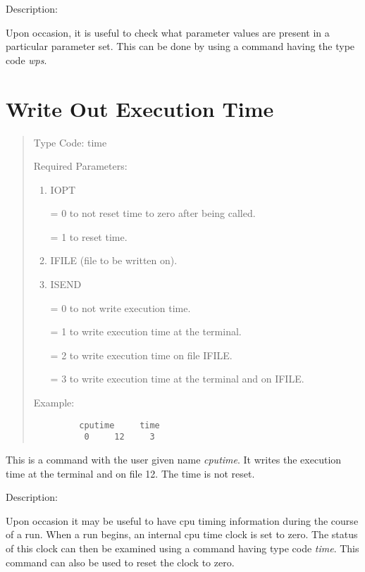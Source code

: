 \vspace{5mm}
     Description:
\vspace{2mm}

Upon occasion, it is useful to check what parameter values are present in
a particular parameter set.  This can be done by using a command having
the type code {\em wps}.

\newpage
\section{Write Out Execution Time}
\begin{quotation}
\noindent Type Code:  time
\vspace{5mm}

\noindent Required Parameters:
\begin{enumerate}
      \item  IOPT

             = 0 to not reset time to zero after being called.

             = 1 to reset time.

      \item  IFILE (file to be written on).

      \item  ISEND

              = 0 to not write execution time.

              = 1 to write execution time at the terminal.

              = 2 to write execution time on file IFILE.

              = 3 to write execution time at the terminal and on IFILE.
\end{enumerate}

\vspace{5mm}
\noindent Example:
\begin{verbatim}
         cputime     time
          0     12     3
\end{verbatim}
\end{quotation}
This is a command with the user given name {\em cputime}.  It writes
the execution time at the terminal and on file 12.  The time is not reset.

\vspace{5mm}
     Description:
\vspace{2mm}

Upon occasion it may be useful to have cpu timing information during the
course of a \Mary run.  When a \Mary run begins, an internal cpu time
clock is set to zero.  The status of this clock can then be examined
using a command having type code {\em time}.  This command can also be
used to reset the clock to zero.

